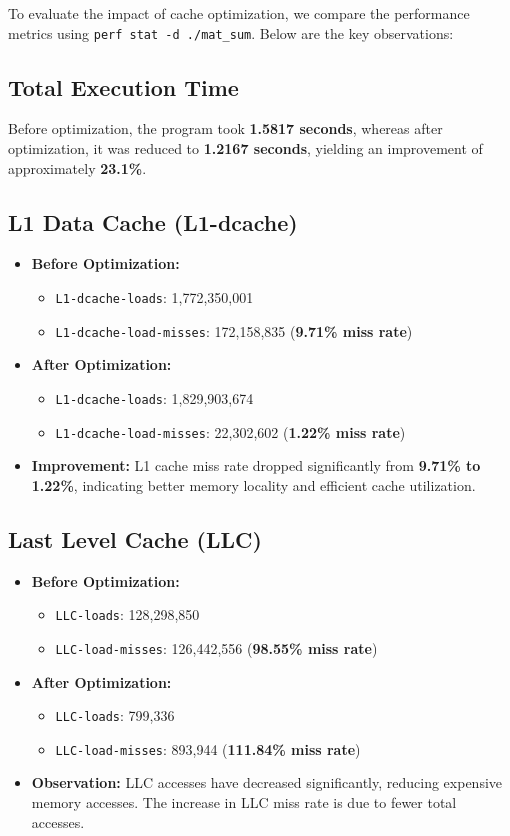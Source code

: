 \documentclass{article}
\begin{document}
To evaluate the impact of cache optimization, we compare the performance metrics using \texttt{perf stat -d ./mat\_sum}. Below are the key observations:

\subsection{Total Execution Time}
Before optimization, the program took \textbf{1.5817 seconds}, whereas after optimization, it was reduced to \textbf{1.2167 seconds}, yielding an improvement of approximately \textbf{23.1\%}.

\subsection{L1 Data Cache (L1-dcache)}
\begin{itemize}
    \item \textbf{Before Optimization:}
    \begin{itemize}
        \item \texttt{L1-dcache-loads}: 1,772,350,001
        \item \texttt{L1-dcache-load-misses}: 172,158,835 (\textbf{9.71\% miss rate})
    \end{itemize}
    \item \textbf{After Optimization:}
    \begin{itemize}
        \item \texttt{L1-dcache-loads}: 1,829,903,674
        \item \texttt{L1-dcache-load-misses}: 22,302,602 (\textbf{1.22\% miss rate})
    \end{itemize}
    \item \textbf{Improvement:} L1 cache miss rate dropped significantly from \textbf{9.71\% to 1.22\%}, indicating better memory locality and efficient cache utilization.
\end{itemize}

\subsection{Last Level Cache (LLC)}
\begin{itemize}
    \item \textbf{Before Optimization:}
    \begin{itemize}
        \item \texttt{LLC-loads}: 128,298,850
        \item \texttt{LLC-load-misses}: 126,442,556 (\textbf{98.55\% miss rate})
    \end{itemize}
    \item \textbf{After Optimization:}
    \begin{itemize}
        \item \texttt{LLC-loads}: 799,336
        \item \texttt{LLC-load-misses}: 893,944 (\textbf{111.84\% miss rate})
    \end{itemize}
    \item \textbf{Observation:} LLC accesses have decreased significantly, reducing expensive memory accesses. The increase in LLC miss rate is due to fewer total accesses.
\end{itemize}
\end{document}
